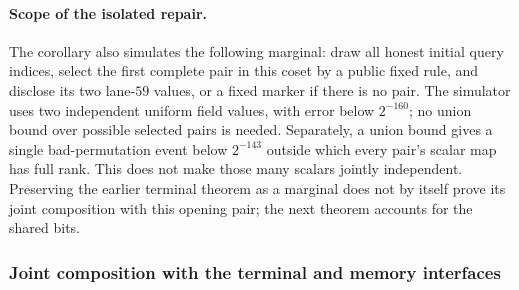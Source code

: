 \paragraph{Scope of the isolated repair.} The corollary also simulates the following marginal: draw all honest initial query indices, select the first complete pair in this coset by a public fixed rule, and disclose its two lane-$59$ values, or a fixed marker if there is no pair. The simulator uses two independent uniform field values, with error below $2^{-160}$; no union bound over possible selected pairs is needed. Separately, a union bound gives a single bad-permutation event below $2^{-143}$ outside which every pair's scalar map has full rank. This does not make those many scalars jointly independent. Preserving the earlier terminal theorem as a marginal does not by itself prove its joint composition with this opening pair; the next theorem accounts for the shared bits.

\subsubsection{Joint composition with the terminal and memory interfaces}

